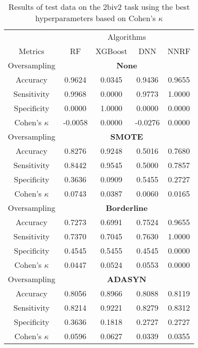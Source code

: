 \begin{table}[!htb]
\centering
\caption{Results of test data on the 2biv2 task using the best hyperparameters based on Cohen's $\kappa$}
\label{tab:2biv2_test_results}
\begin{tabular}{c | c c c c}
\hline
 & \multicolumn{4}{c}{Algorithms}\\ 
Metrics &RF & XGBoost & DNN & NNRF\\ 
\hline
Oversampling &\multicolumn{4}{|c}{\textbf{None}}\\ 
\hline
Accuracy & 0.9624 & 0.0345 & 0.9436 & 0.9655\\ 
Sensitivity & 0.9968 & 0.0000 & 0.9773 & 1.0000\\ 
Specificity & 0.0000 & 1.0000 & 0.0000 & 0.0000\\ 
Cohen's $\kappa$ & -0.0058 & 0.0000 & -0.0276 & 0.0000\\ 
\hline
Oversampling &\multicolumn{4}{|c}{\textbf{SMOTE}}\\ 
\hline
Accuracy & 0.8276 & 0.9248 & 0.5016 & 0.7680\\ 
Sensitivity & 0.8442 & 0.9545 & 0.5000 & 0.7857\\ 
Specificity & 0.3636 & 0.0909 & 0.5455 & 0.2727\\ 
Cohen's $\kappa$ & 0.0743 & 0.0387 & 0.0060 & 0.0165\\ 
\hline
Oversampling &\multicolumn{4}{|c}{\textbf{Borderline}}\\ 
\hline
Accuracy & 0.7273 & 0.6991 & 0.7524 & 0.9655\\ 
Sensitivity & 0.7370 & 0.7045 & 0.7630 & 1.0000\\ 
Specificity & 0.4545 & 0.5455 & 0.4545 & 0.0000\\ 
Cohen's $\kappa$ & 0.0447 & 0.0524 & 0.0553 & 0.0000\\ 
\hline
Oversampling &\multicolumn{4}{|c}{\textbf{ADASYN}}\\ 
\hline
Accuracy & 0.8056 & 0.8966 & 0.8088 & 0.8119\\ 
Sensitivity & 0.8214 & 0.9221 & 0.8279 & 0.8312\\ 
Specificity & 0.3636 & 0.1818 & 0.2727 & 0.2727\\ 
Cohen's $\kappa$ & 0.0596 & 0.0627 & 0.0339 & 0.0355\\ 
\hline
\end{tabular}
\end{table}

